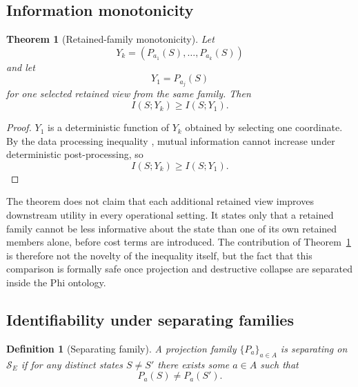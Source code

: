\documentclass[11pt,a4paper]{article}
\newtheorem{definition}{Definition}
\newtheorem{theorem}{Theorem}
\begin{document}
\subsection{Information monotonicity}

\begin{theorem}[Retained-family monotonicity]
\label{thm:monotonicity}
Let
\begin{equation}
Y_k = (P_{a_1}(S), \ldots, P_{a_k}(S))
\end{equation}
and let
\begin{equation}
Y_1 = P_{a_j}(S)
\end{equation}
for one selected retained view from the same family. Then
\begin{equation}
I(S;Y_k) \geq I(S;Y_1).
\end{equation}
\end{theorem}

\begin{proof}
$Y_1$ is a deterministic function of $Y_k$ obtained by selecting one coordinate. By the data processing inequality \cite{cover2006elements}, mutual information cannot increase under deterministic post-processing, so
\begin{equation}
I(S;Y_k) \geq I(S;Y_1).
\end{equation}
\end{proof}

The theorem does not claim that each additional retained view improves downstream utility in every operational setting. It states only that a retained family cannot be less informative about the state than one of its own retained members alone, before cost terms are introduced.
The contribution of Theorem~\ref{thm:monotonicity} is therefore not the novelty of the inequality itself, but the fact that this comparison is formally safe once projection and destructive collapse are separated inside the Phi ontology.

\subsection{Identifiability under separating families}
\label{sec:ident}

\begin{definition}[Separating family]
A projection family $\{P_a\}_{a \in A}$ is separating on $\mathcal{S}_E$ if for any distinct states $S \neq S'$ there exists some $a \in A$ such that
\begin{equation}
P_a(S) \neq P_a(S').
\end{equation}
\end{definition}
\end{document}
